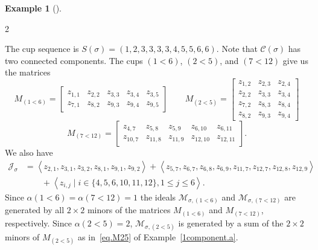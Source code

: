 \documentclass[11pt]{amsart}
\theoremstyle{remark}
\theoremstyle{remark}
\theoremstyle{definition}
\theoremstyle{definition}
\theoremstyle{definition}
\newtheorem{eg_no_qed}[theorem]{Example}
\newenvironment{ex}[1][]{\begin{eg_no_qed}[#1]\renewcommand{\qedsymbol}{$\Diamond$}\pushQED{\qed}}{\popQED\end{eg_no_qed}}
\numberwithin{equation}{section}
\newcommand{\ga}{\alpha}
\newcommand{\gs}{\sigma}
\newcommand{\cc}{\mathcal{C}}
\newcommand{\cj}{\mathcal{J}}
\newcommand{\cm}{\mathcal{M}}
\newcommand{\cupsigma}{\cc(\gs)}
\begin{document}
\begin{ex}
\begin{multicols}{2}
\end{multicols}
\vspace*{-.1in}
\noindent The cup sequence is $S(\gs) = (1,2,3,3,3,3,4,5,5,6,6)$. Note that $\cupsigma$ has two connected components. The cups $(1<6)$, $(2<5)$, and $(7<12)$ give us the matrices
\begin{equation*}
M_{(1<6)} = \begin{bmatrix} z_{1,1}& z_{2,2}& z_{3,3} & z_{3,4} &z_{3,5}\\ z_{7,1}& z_{8,2}& z_{9,3} & z_{9,4} &z_{9,5} \end{bmatrix}
\quad  \quad
M_{(2<5)} = \begin{bmatrix} z_{1,2}& z_{2,3}& z_{2,4} \\
z_{2,2}& z_{3,3}& z_{3,4}\\ z_{7,2} & z_{8,3} & z_{8,4}\\
z_{8,2}& z_{9,3}& z_{9,4} \end{bmatrix}
\end{equation*} 
    \quad {}\quad
\begin{equation*}
 M_{(7<12)}=\begin{bmatrix} z_{4,7}& z_{5,8}& z_{5,9}& z_{6,10}& z_{6,11} \\ z_{10,7}& z_{11,8}& z_{11,9}& z_{12,10}& z_{12,11} 
\end{bmatrix}.
\end{equation*}
We also have
\begin{align*}
\cj_\gs&=\left\langle z_{2,1}, z_{3,1}, z_{3,2}, z_{8,1}, z_{9,1}, z_{9, 2} \right \rangle + \left\langle z_{5,7},z_{6,7}, z_{6,8}, z_{6,9}, z_{11,7},z_{12,7}, z_{12,8}, z_{12,9}\right\rangle \\
& \quad \quad +\left\langle z_{i,j} \mid i \in \{4,5,6,10,11,12\}, 1\leq j \leq 6 \right\rangle.
\end{align*}
Since $\ga(1<6)=\ga(7<12)=1$ the ideals $\cm_{\gs,(1<6)}$ and $\cm_{\gs,(7<12)}$ are generated by all $2\times 2$ minors of the matrices $M_{(1<6)}$ and $M_{(7<12)}$, respectively. Since $\ga(2<5) = 2$, $\cm_{\gs,(2<5)}$ is generated by a sum of the $2\times 2$ minors of $M_{(2<5)}$ as in~\eqref{eq.M25} of Example~\ref{1component.a}. 

\end{ex}
\end{document}

